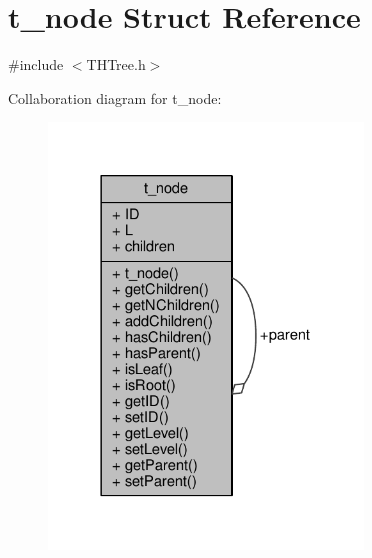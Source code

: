 \hypertarget{structt__node}{}\section{t\+\_\+node Struct Reference}
\label{structt__node}


{\ttfamily \#include $<$T\+H\+Tree.\+h$>$}



Collaboration diagram for t\+\_\+node\+:\nopagebreak
\begin{figure}[H]
\begin{center}
\leavevmode
\includegraphics[width=237pt]{structt__node__coll__graph}
\end{center}
\end{figure}
